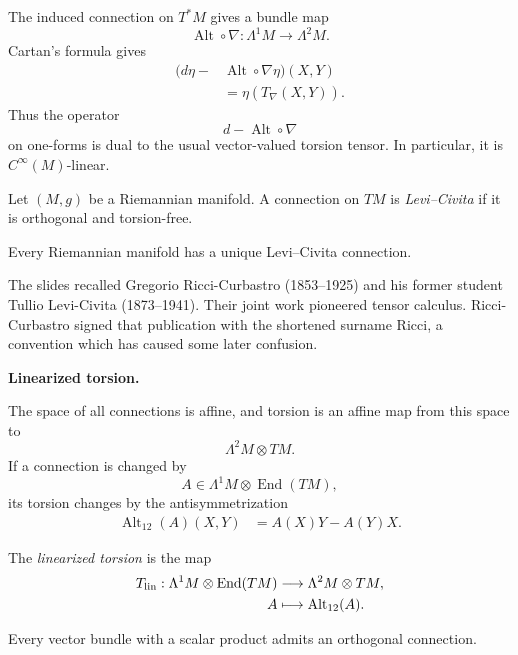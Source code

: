 The induced connection on $T^*M$ gives a
bundle map
$$
\operatorname{Alt}\circ\nabla:
\Lambda^1M\longrightarrow\Lambda^2M.
$$
Cartan's formula gives
$$
\begin{aligned}
(d\eta-&\operatorname{Alt}
\circ\nabla\eta)(X,Y)\\
&=\eta(T_\nabla(X,Y)).
\end{aligned}
$$
Thus the operator
$$
d-\operatorname{Alt}\circ\nabla
$$
on one-forms is dual to the usual
vector-valued torsion tensor. In particular,
it is $C^\infty(M)$-linear.

\begin{definition}
\label{definition-levi-civita}
Let $(M,g)$ be a Riemannian manifold. A
connection on $TM$ is
{\it Levi--Civita} if it is orthogonal and
torsion-free.
\end{definition}

\begin{theorem}
\label{theorem-fundamental-riemannian}
Every Riemannian manifold has a unique
Levi--Civita connection.
\end{theorem}

The slides recalled Gregorio
Ricci-Curbastro (1853--1925) and his former
student Tullio Levi-Civita (1873--1941).
Their joint work pioneered tensor calculus.
Ricci-Curbastro signed that publication with
the shortened surname Ricci, a convention
which has caused some later confusion.

\medskip\noindent
{\bf Linearized torsion.}

The space of all connections is affine, and
torsion is an affine map from this space to
$$
\Lambda^2M\otimes TM.
$$
If a connection is changed by
$$
A\in\Lambda^1M\otimes
\operatorname{End}(TM),
$$
its torsion changes by the
antisymmetrization
$$
\begin{aligned}
\operatorname{Alt}_{12}(A)(X,Y)
&=A(X)Y-A(Y)X.
\end{aligned}
$$

\begin{definition}
\label{definition-linearized-torsion}
The {\it linearized torsion} is the map
$$
\begin{aligned}
T_{\rm lin}:\Lambda^1M\otimes
\operatorname{End}(TM)
&\longrightarrow
\Lambda^2M\otimes TM,\\
A&\longmapsto
\operatorname{Alt}_{12}(A).
\end{aligned}
$$
\end{definition}

\begin{proposition}
\label{proposition-orthogonal-exists}
Every vector bundle with a scalar product
admits an orthogonal connection.
\end{proposition}

